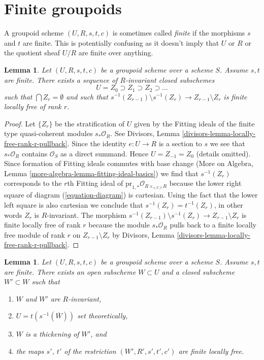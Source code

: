 \documentclass{stacks-project}
\theoremstyle{plain}
\newtheorem{lemma}[subsection]{Lemma}
\theoremstyle{definition}
\theoremstyle{remark}
\numberwithin{equation}{subsection}
\begin{document}
\section{Finite groupoids}
\label{section-finite-groupoids}

\noindent
A groupoid scheme $(U, R, s, t, c)$ is sometimes called {\it finite} if the
morphisms $s$ and $t$ are finite. This is potentially confusing as it doesn't
imply that $U$ or $R$ or the quotient sheaf $U/R$ are finite over anything.

\begin{lemma}
\label{lemma-finite-stratify}
Let $(U, R, s, t, c)$ be a groupoid scheme over a scheme $S$. Assume $s, t$
are finite. There exists a sequence of $R$-invariant closed subschemes
$$
U = Z_0 \supset Z_1 \supset Z_2 \supset \ldots
$$
such that $\bigcap Z_r = \emptyset$ and such that
$s^{-1}(Z_{r - 1}) \setminus s^{-1}(Z_r) \to Z_{r - 1} \setminus Z_r$
is finite locally free of rank $r$.
\end{lemma}

\begin{proof}
Let $\{Z_r\}$ be the stratification of $U$ given by the Fitting ideals
of the finite type quasi-coherent modules $s_*\mathcal{O}_R$. See
Divisors, Lemma \ref{divisors-lemma-locally-free-rank-r-pullback}.
Since the identity $e : U \to R$ is a section to $s$ we see that
$s_*\mathcal{O}_R$ contains $\mathcal{O}_S$ as a direct summand.
Hence $U = Z_{-1} = Z_0$ (details omitted).
Since formation of Fitting ideals commutes with base change
(More on Algebra, Lemma \ref{more-algebra-lemma-fitting-ideal-basics})
we find that $s^{-1}(Z_r)$ corresponds to the $r$th Fitting ideal
of $\text{pr}_{1, *}\mathcal{O}_{R \times_{s, U, t} R}$ because
the lower right square of diagram (\ref{equation-diagram}) is cartesian.
Using the fact that the lower left square is also cartesian we conclude
that $s^{-1}(Z_r) = t^{-1}(Z_r)$, in other words $Z_r$ is $R$-invariant.
The morphism
$s^{-1}(Z_{r - 1}) \setminus s^{-1}(Z_r) \to Z_{r - 1} \setminus Z_r$
is finite locally free of rank $r$ because the module
$s_*\mathcal{O}_R$ pulls back to a finite locally free module of rank $r$
on $Z_{r - 1} \setminus Z_r$ by
Divisors, Lemma \ref{divisors-lemma-locally-free-rank-r-pullback}.
\end{proof}

\begin{lemma}
\label{lemma-finite-flat-over-almost-dense-subscheme}
Let $(U, R, s, t, c)$ be a groupoid scheme over a scheme $S$. Assume $s, t$
are finite. There exists an open subscheme $W \subset U$ and a closed
subscheme $W' \subset W$ such that
\begin{enumerate}
\item $W$ and $W'$ are $R$-invariant,
\item $U = t(s^{-1}(\overline{W}))$ set theoretically,
\item $W$ is a thickening of $W'$, and
\item the maps $s'$, $t'$ of the restriction $(W', R', s', t', c')$
are finite locally free.
\end{enumerate}
\end{lemma}
\end{document}

